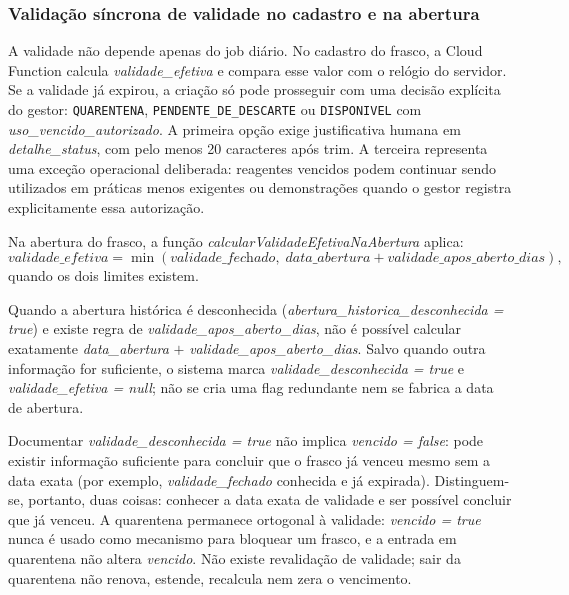 \subsubsection{Validação síncrona de validade no cadastro e na abertura}
A validade não depende apenas do job diário. No cadastro do frasco, a Cloud Function calcula \textit{validade\_efetiva} e compara esse valor com o relógio do servidor. Se a validade já expirou, a criação só pode prosseguir com uma decisão explícita do gestor: \texttt{QUARENTENA}, \texttt{PENDENTE\_DE\_DESCARTE} ou \texttt{DISPONIVEL} com \textit{uso\_vencido\_autorizado}. A primeira opção exige justificativa humana em \textit{detalhe\_status}, com pelo menos 20 caracteres após trim. A terceira representa uma exceção operacional deliberada: reagentes vencidos podem continuar sendo utilizados em práticas menos exigentes ou demonstrações quando o gestor registra explicitamente essa autorização.

Na abertura do frasco, a função \textit{calcularValidadeEfetivaNaAbertura} aplica:
\[
\textit{validade\_efetiva} = \min(\textit{validade\_fechado},\; \textit{data\_abertura} + \textit{validade\_apos\_aberto\_dias}),
\]
quando os dois limites existem.

Quando a abertura histórica é desconhecida (\textit{abertura\_historica\_desconhecida = true}) e existe regra de \textit{validade\_apos\_aberto\_dias}, não é possível calcular exatamente \textit{data\_abertura} $+$ \textit{validade\_apos\_aberto\_dias}. Salvo quando outra informação for suficiente, o sistema marca \textit{validade\_desconhecida = true} e \textit{validade\_efetiva = null}; não se cria uma flag redundante nem se fabrica a data de abertura.

Documentar \textit{validade\_desconhecida = true} não implica \textit{vencido = false}: pode existir informação suficiente para concluir que o frasco já venceu mesmo sem a data exata (por exemplo, \textit{validade\_fechado} conhecida e já expirada). Distinguem-se, portanto, duas coisas: conhecer a data exata de validade e ser possível concluir que já venceu. A quarentena permanece ortogonal à validade: \textit{vencido = true} nunca é usado como mecanismo para bloquear um frasco, e a entrada em quarentena não altera \textit{vencido}. Não existe revalidação de validade; sair da quarentena não renova, estende, recalcula nem zera o vencimento.

